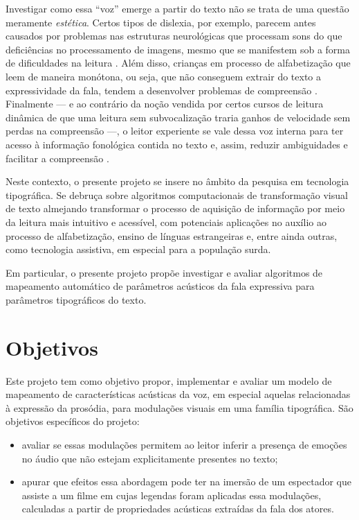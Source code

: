 \documentclass[a4paper,11pt,titlepage,singlespacing]{article}
\begin{document}
Investigar como essa ``voz'' emerge a partir do texto não se trata de uma questão meramente \textit{estética}. Certos tipos de dislexia, por exemplo, parecem antes causados por problemas nas estruturas neurológicas que processam sons do que deficiências no processamento de imagens, mesmo que se manifestem sob a forma de dificuldades na  leitura \cite[cap.8]{seidenberg2017}. Além disso, crianças em processo de alfabetização que leem de maneira monótona, ou seja, que não conseguem extrair do texto a expressividade da fala, tendem a desenvolver problemas de compreensão \cite{bessemans2017}. Finalmente — e ao contrário da noção vendida por certos cursos de leitura dinâmica de que uma leitura sem subvocalização traria ganhos de velocidade sem perdas na compreensão —, o leitor experiente se vale dessa voz interna para ter acesso à informação fonológica contida no texto e, assim, reduzir ambiguidades e facilitar a compreensão \cite[cap.4]{seidenberg2017}.

Neste contexto, o presente projeto se insere no âmbito da pesquisa em tecnologia tipográfica. Se debruça sobre algoritmos computacionais de transformação visual de texto almejando transformar o processo de aquisição de informação por meio da leitura mais intuitivo e acessível, com potenciais aplicações no auxílio ao processo de alfabetização, ensino de línguas estrangeiras e, entre ainda outras, como tecnologia assistiva, em especial para a população surda.

Em particular, o presente projeto propõe investigar e avaliar algoritmos de mapeamento automático de parâmetros acústicos da fala expressiva para parâmetros tipográficos do texto.



\section{Objetivos}

\noindent Este projeto tem como objetivo propor, implementar e avaliar um modelo de mapeamento de características acústicas da voz, em especial aquelas relacionadas à expressão da prosódia, para modulações visuais em uma família tipográfica. 
São objetivos específicos do projeto:
\begin{itemize}
    \item avaliar se essas modulações permitem ao leitor inferir a presença de emoções no áudio que não estejam explicitamente presentes no texto;
    \item apurar que efeitos essa abordagem pode ter na imersão de um espectador que assiste a um filme em cujas legendas foram aplicadas essa modulações, calculadas a partir de propriedades acústicas extraídas da fala dos atores.
\end{itemize} 
\end{document}
